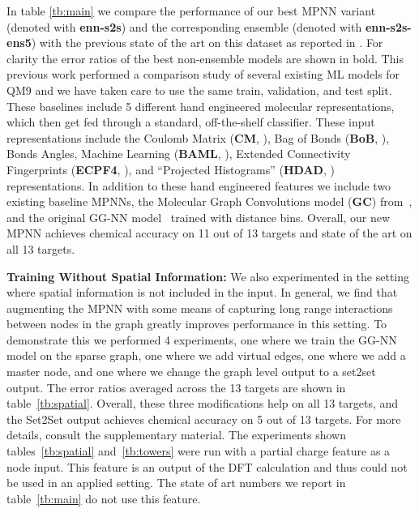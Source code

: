 \documentclass{article}
\begin{document}
In table \ref{tb:main} we compare the performance of our best MPNN variant (denoted with \textbf{enn-s2s}) and the corresponding ensemble (denoted with \textbf{enn-s2s-ens5}) with the previous state of the art on this dataset as reported in \citet{colab}. For clarity the error ratios of the best non-ensemble models are shown in bold. This previous work performed a comparison study of several existing ML models for QM9 and we have taken care to use the same train, validation, and test split. These baselines include 5 different hand engineered molecular representations, which then get fed through a standard, off-the-shelf classifier. These input representations include the Coulomb Matrix (\textbf{CM}, \citet{coloumb}), Bag of Bonds (\textbf{BoB}, \citet{bob}), Bonds Angles, Machine Learning (\textbf{BAML}, \citet{BAML}), Extended Connectivity Fingerprints (\textbf{ECPF4}, \citet{rogers2010extended}), and ``Projected Histograms'' (\textbf{HDAD}, \citet{colab}) representations. In addition to these hand engineered features we include two existing baseline MPNNs, the Molecular Graph Convolutions model (\textbf{GC}) from~\citet{kearnes2016molecular}, and the original GG-NN model~\citet{yujia} trained with distance bins. Overall, our new MPNN achieves chemical accuracy on 11 out of 13 targets and state of the art on all 13 targets. 



\textbf{Training Without Spatial Information:} We also experimented in the setting where spatial information is not included in the input. In general, we find that augmenting the MPNN with some means of capturing long range interactions between nodes in the graph greatly improves performance in this setting. To demonstrate this we performed 4 experiments, one where we train the GG-NN model on the sparse graph, one where we add virtual edges, one where we add a master node, and one where we change the graph level output to a set2set output. The error ratios averaged across the 13 targets are shown in table~\ref{tb:spatial}. Overall, these three modifications help on all 13 targets, and the Set2Set output achieves chemical accuracy on 5 out of 13 targets. For more details, consult the supplementary material. The experiments shown tables~\ref{tb:spatial} and~\ref{tb:towers} were run with a partial charge feature as a node input. This feature is an output of the DFT calculation and thus could not be used in an applied setting. The state of art numbers we report in table~\ref{tb:main} do not use this feature.
\end{document}
